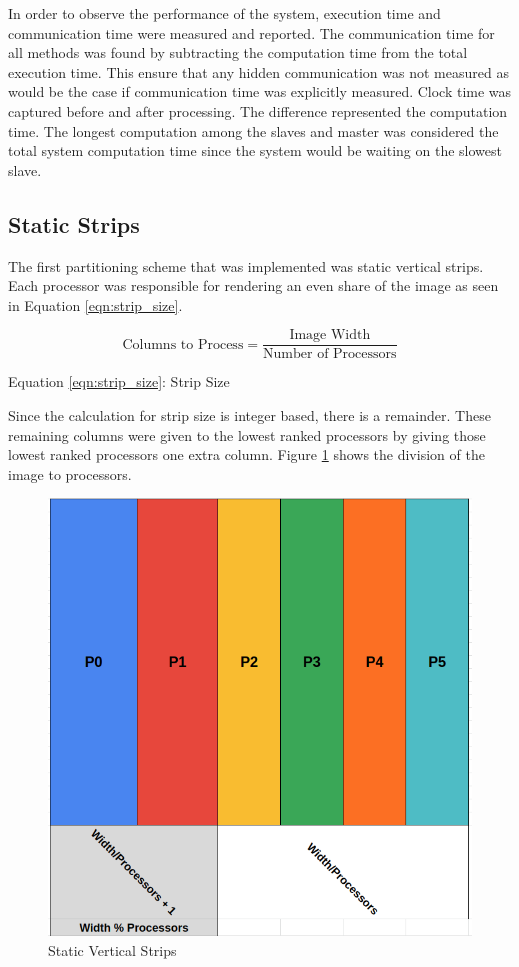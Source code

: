 \documentclass[11pt]{article}
\begin{document}
	In order to observe the performance of the system, execution time and communication time were measured and reported. The communication time for all methods was found by subtracting the computation time from the total execution time. This ensure that any hidden communication was not measured as would be the case if communication time was explicitly measured. Clock time was captured before and after processing. The difference represented the computation time. The longest computation among the slaves and master was considered the total system computation time since the system would be waiting on the slowest slave. 
	

	\subsection{Static Strips}
		The first partitioning scheme that was implemented was static vertical strips. Each processor was responsible for rendering an even share of the image as seen in Equation \ref{eqn:strip_size}.
		
		\begin{equation}\label{eqn:strip_size}
			\text{Columns to Process} = \frac{\text{Image Width}}{\text{Number of Processors}}
		\end{equation}
		\begin{center}
			Equation \ref{eqn:strip_size}: Strip Size
		\end{center}
	
		Since the calculation for strip size is integer based, there is a remainder. These remaining columns were given to the lowest ranked processors by giving those lowest ranked processors one extra column. Figure \ref{fig:strips} shows the division of the image to processors.
		
		\begin{figure}[H]
			\centering
			\includegraphics[width=0.7\linewidth]{Pictures/Strips}
			\caption{Static Vertical Strips}
			\label{fig:strips}
		\end{figure}
	
\end{document}
